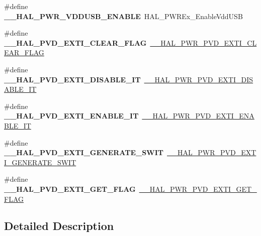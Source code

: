 \begin{DoxyCompactItemize}
\item 
\mbox{\label{group___h_a_l___p_w_r___aliased___macros_ga56a0796742be5992269988f4509011fe}} 
\#define {\bfseries \+\_\+\+\_\+\+H\+A\+L\+\_\+\+P\+W\+R\+\_\+\+V\+D\+D\+U\+S\+B\+\_\+\+E\+N\+A\+B\+LE}~H\+A\+L\+\_\+\+P\+W\+R\+Ex\+\_\+\+Enable\+Vdd\+U\+SB
\item 
\mbox{\label{group___h_a_l___p_w_r___aliased___macros_ga534279f1d4354f4372991fe757acad7c}} 
\#define {\bfseries \+\_\+\+\_\+\+H\+A\+L\+\_\+\+P\+V\+D\+\_\+\+E\+X\+T\+I\+\_\+\+C\+L\+E\+A\+R\+\_\+\+F\+L\+AG}~\mbox{\hyperlink{group___p_w_r___exported___macro_gac0fb2218bc050f5d8fdb1a3f28590352}{\+\_\+\+\_\+\+H\+A\+L\+\_\+\+P\+W\+R\+\_\+\+P\+V\+D\+\_\+\+E\+X\+T\+I\+\_\+\+C\+L\+E\+A\+R\+\_\+\+F\+L\+AG}}
\item 
\mbox{\label{group___h_a_l___p_w_r___aliased___macros_gaaeb62592dbf02f8aa76ac2941090e0ed}} 
\#define {\bfseries \+\_\+\+\_\+\+H\+A\+L\+\_\+\+P\+V\+D\+\_\+\+E\+X\+T\+I\+\_\+\+D\+I\+S\+A\+B\+L\+E\+\_\+\+IT}~\mbox{\hyperlink{group___p_w_r___exported___macro_gad240d7bf8f15191b068497b9aead1f1f}{\+\_\+\+\_\+\+H\+A\+L\+\_\+\+P\+W\+R\+\_\+\+P\+V\+D\+\_\+\+E\+X\+T\+I\+\_\+\+D\+I\+S\+A\+B\+L\+E\+\_\+\+IT}}
\item 
\mbox{\label{group___h_a_l___p_w_r___aliased___macros_ga3259ab94dbb26432e4139917a4e04411}} 
\#define {\bfseries \+\_\+\+\_\+\+H\+A\+L\+\_\+\+P\+V\+D\+\_\+\+E\+X\+T\+I\+\_\+\+E\+N\+A\+B\+L\+E\+\_\+\+IT}~\mbox{\hyperlink{group___p_w_r___exported___macro_ga3180f039cf14ef78a64089f387f8f9c2}{\+\_\+\+\_\+\+H\+A\+L\+\_\+\+P\+W\+R\+\_\+\+P\+V\+D\+\_\+\+E\+X\+T\+I\+\_\+\+E\+N\+A\+B\+L\+E\+\_\+\+IT}}
\item 
\mbox{\label{group___h_a_l___p_w_r___aliased___macros_gaf9d584e87f1888f0c39976613208a81e}} 
\#define {\bfseries \+\_\+\+\_\+\+H\+A\+L\+\_\+\+P\+V\+D\+\_\+\+E\+X\+T\+I\+\_\+\+G\+E\+N\+E\+R\+A\+T\+E\+\_\+\+S\+W\+IT}~\mbox{\hyperlink{group___p_w_r___exported___macro_gaba4a7968f5c4c4ca6a7047b147ba18d4}{\+\_\+\+\_\+\+H\+A\+L\+\_\+\+P\+W\+R\+\_\+\+P\+V\+D\+\_\+\+E\+X\+T\+I\+\_\+\+G\+E\+N\+E\+R\+A\+T\+E\+\_\+\+S\+W\+IT}}
\item 
\mbox{\label{group___h_a_l___p_w_r___aliased___macros_ga1d5be8243a9659943e0b861d2d5ce923}} 
\#define {\bfseries \+\_\+\+\_\+\+H\+A\+L\+\_\+\+P\+V\+D\+\_\+\+E\+X\+T\+I\+\_\+\+G\+E\+T\+\_\+\+F\+L\+AG}~\mbox{\hyperlink{group___p_w_r___exported___macro_ga5e66fa75359b51066e0731ac1e5ae438}{\+\_\+\+\_\+\+H\+A\+L\+\_\+\+P\+W\+R\+\_\+\+P\+V\+D\+\_\+\+E\+X\+T\+I\+\_\+\+G\+E\+T\+\_\+\+F\+L\+AG}}
\end{DoxyCompactItemize}


\subsection{Detailed Description}
